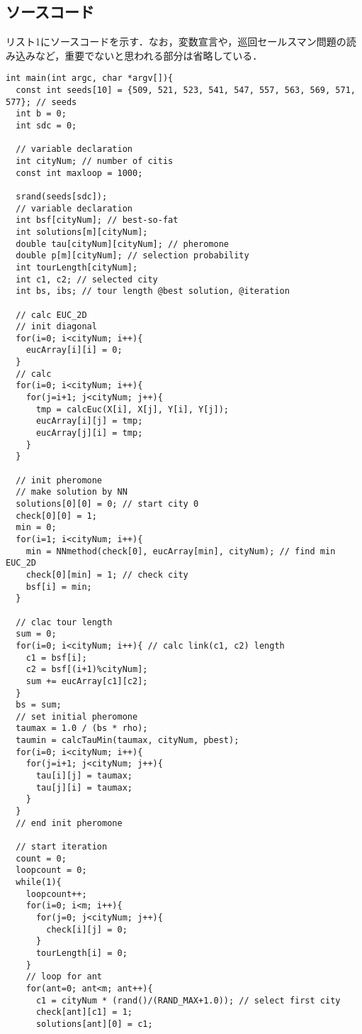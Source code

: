 \documentclass[a4j]{jarticle}
\begin{document}
\clearpage
\subsection*{ソースコード}
リスト1にソースコードを示す．なお，変数宣言や，巡回セールスマン問題の読み込みなど，重要でないと思われる部分は省略している．
\begin{lstlisting}[caption=MMAS.c, label=MMAS, xleftmargin=1cm]
int main(int argc, char *argv[]){
  const int seeds[10] = {509, 521, 523, 541, 547, 557, 563, 569, 571, 577}; // seeds
  int b = 0;
  int sdc = 0;
  
  // variable declaration
  int cityNum; // number of citis
  const int maxloop = 1000;

  srand(seeds[sdc]); 
  // variable declaration
  int bsf[cityNum]; // best-so-fat
  int solutions[m][cityNum];
  double tau[cityNum][cityNum]; // pheromone
  double p[m][cityNum]; // selection probability
  int tourLength[cityNum];
  int c1, c2; // selected city
  int bs, ibs; // tour length @best solution, @iteration

  // calc EUC_2D
  // init diagonal 
  for(i=0; i<cityNum; i++){
    eucArray[i][i] = 0;
  }
  // calc 
  for(i=0; i<cityNum; i++){
    for(j=i+1; j<cityNum; j++){
      tmp = calcEuc(X[i], X[j], Y[i], Y[j]);
      eucArray[i][j] = tmp;
      eucArray[j][i] = tmp;
    }
  }

  // init pheromone
  // make solution by NN
  solutions[0][0] = 0; // start city 0
  check[0][0] = 1;
  min = 0;
  for(i=1; i<cityNum; i++){
    min = NNmethod(check[0], eucArray[min], cityNum); // find min EUC_2D
    check[0][min] = 1; // check city
    bsf[i] = min;
  }
  
  // clac tour length 
  sum = 0;
  for(i=0; i<cityNum; i++){ // calc link(c1, c2) length
    c1 = bsf[i]; 
    c2 = bsf[(i+1)%cityNum];
    sum += eucArray[c1][c2];
  }
  bs = sum;
  // set initial pheromone
  taumax = 1.0 / (bs * rho);
  taumin = calcTauMin(taumax, cityNum, pbest);
  for(i=0; i<cityNum; i++){
    for(j=i+1; j<cityNum; j++){
      tau[i][j] = taumax;
      tau[j][i] = taumax;
    }
  }
  // end init pheromone
  
  // start iteration
  count = 0;
  loopcount = 0;
  while(1){
    loopcount++;
    for(i=0; i<m; i++){
      for(j=0; j<cityNum; j++){
        check[i][j] = 0;
      }
      tourLength[i] = 0;
    }
    // loop for ant
    for(ant=0; ant<m; ant++){
      c1 = cityNum * (rand()/(RAND_MAX+1.0)); // select first city
      check[ant][c1] = 1;
      solutions[ant][0] = c1;
      

\end{lstlisting}
\end{document}
